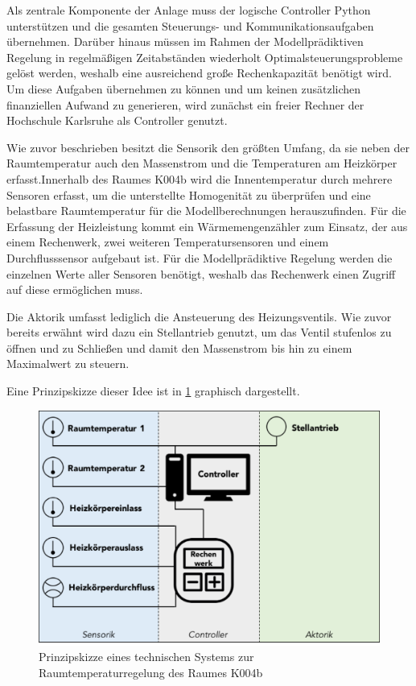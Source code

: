 Als zentrale Komponente der Anlage muss der logische Controller Python unterstützen und die gesamten Steuerungs- und Kommunikationsaufgaben übernehmen. Darüber hinaus müssen im Rahmen der Modellprädiktiven Regelung in regelmäßigen Zeitabständen wiederholt Optimalsteuerungsprobleme gelöst werden, weshalb eine ausreichend große Rechenkapazität benötigt wird. Um diese Aufgaben übernehmen zu können und um keinen zusätzlichen finanziellen Aufwand zu generieren, wird zunächst ein freier Rechner der Hochschule Karlsruhe als Controller genutzt.  

Wie zuvor beschrieben besitzt die Sensorik den größten Umfang, da sie neben der Raumtemperatur auch den Massenstrom und die Temperaturen am Heizkörper erfasst.Innerhalb des Raumes K004b wird die Innentemperatur durch mehrere Sensoren erfasst, um die unterstellte Homogenität zu überprüfen und eine belastbare Raumtemperatur für die Modellberechnungen herauszufinden. Für die Erfassung der Heizleistung kommt ein Wärmemengenzähler zum Einsatz, der aus einem Rechenwerk, zwei weiteren Temperatursensoren und einem Durchflusssensor aufgebaut ist. Für die Modellprädiktive Regelung werden die einzelnen Werte aller Sensoren benötigt, weshalb das Rechenwerk einen Zugriff auf diese ermöglichen muss.

Die Aktorik umfasst lediglich die Ansteuerung des Heizungsventils. Wie zuvor bereits erwähnt wird dazu ein Stellantrieb genutzt, um das Ventil stufenlos zu öffnen und zu Schließen und damit den Massenstrom bis hin zu einem Maximalwert zu steuern. 

Eine Prinzipskizze dieser Idee ist in \ref{fig:konzept} graphisch dargestellt.

\begin{figure}
\centering
\includegraphics[width=\textwidth]{abbildungen/20160318_Konzept}
\caption{Prinzipskizze eines technischen Systems zur Raumtemperaturregelung des Raumes K004b}
\label{fig:konzept}
\end{figure}

